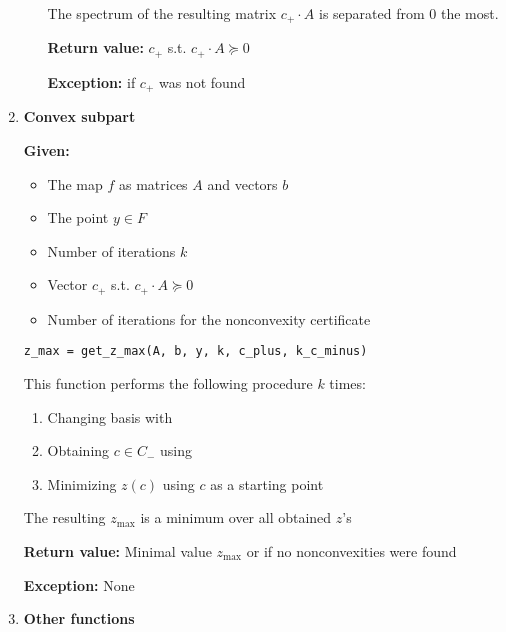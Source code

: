 \documentclass[a4paper]{article}
\theoremstyle{definition}
\begin{document}
\begin{enumerate}
\begin{enumerate}
The spectrum of the resulting matrix $c_+\cdot A$ is separated from $0$ the most.
	
	{\bf Return value:} $c_+$ s.t. $c_+\cdot A\succeq 0$
	
	{\bf Exception:} if $c_+$ was not found
\end{enumerate}

\item {\bf Convex subpart}

{\bf Given:}
\begin{itemize}
	\item The map $f$ as matrices $A$ and vectors $b$
	\item The point $y\in F$
	\item Number of iterations $k$
	\item Vector $c_+$ s.t. $c_+\cdot A\succeq 0$
	\item Number of iterations  for the nonconvexity certificate
\end{itemize}
\begin{verbatim}
z_max = get_z_max(A, b, y, k, c_plus, k_c_minus)
\end{verbatim}
This function performs the following procedure $k$ times:
\begin{enumerate}
\item Changing basis with 
\item Obtaining $c\in C_-$ using 
\item Minimizing $z(c)$ using $c$ as a starting point
\end{enumerate}

The resulting $z_{\max}$ is a minimum over all obtained $z$'s

{\bf Return value:} Minimal value $z_{\max}$ or  if no nonconvexities were found

{\bf Exception:} None

\item {\bf Other functions}


\end{enumerate}
\end{document}
